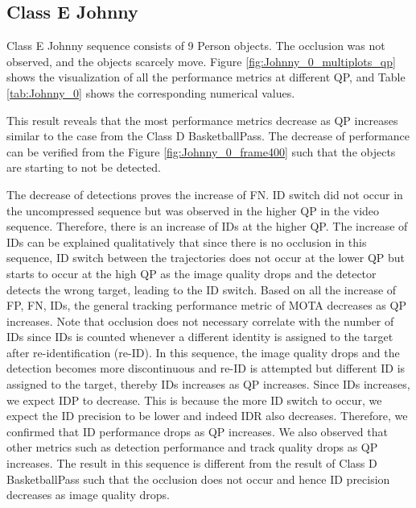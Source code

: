 \subsection{Class E Johnny}
Class E Johnny sequence consists of 9 Person objects. The occlusion was not observed, and the objects scarcely move. Figure \ref{fig:Johnny_0_multiplots_qp} shows the visualization of all the performance metrics at different QP, and Table \ref{tab:Johnny_0} shows the corresponding numerical values. 


This result reveals that the most performance metrics decrease as QP increases similar to the case from the Class D BasketballPass. The decrease of performance can be verified from the Figure \ref{fig:Johnny_0_frame400} such that the objects are starting to not be detected.

The decrease of detections proves the increase of FN. ID switch did not occur in the uncompressed sequence but was observed in the higher QP in the video sequence. Therefore, there is an increase of IDs at the higher QP. The increase of IDs can be explained qualitatively that since there is no occlusion in this sequence, ID switch between the trajectories does not occur at the lower QP but starts to occur at the high QP as the image quality drops and the detector detects the wrong target, leading to the ID switch. Based on all the increase of FP, FN, IDs, the general tracking performance metric of MOTA decreases as QP increases. Note that occlusion does not necessary correlate with the number of IDs since IDs is counted whenever a different identity is assigned to the target after re-identification (re-ID). In this sequence, the image quality drops and the detection becomes more discontinuous and re-ID is attempted but different ID is assigned to the target, thereby IDs increases as QP increases. Since IDs increases, we expect IDP to decrease. This is because the more ID switch to occur, we expect the ID precision to be lower and indeed IDR also decreases. Therefore, we confirmed that ID performance drops as QP increases. We also observed that other metrics such as detection performance and track quality drops as QP increases. The result in this sequence is different from the result of Class D BasketballPass such that the occlusion does not occur and hence ID precision decreases as image quality drops. 

